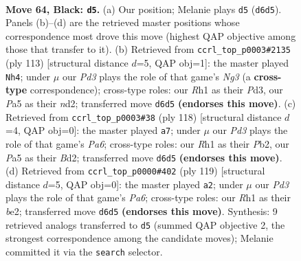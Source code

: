 \documentclass[11pt]{article}
\begin{document}
\clearpage

\begin{figure}[p]\centering
\begin{subfigure}{0.46\textwidth}\centering
\resizebox{\linewidth}{!}{%
\newchessgame
\chessboard[
  setfen={8/6k1/2pp4/p7/5K2/8/8/7r b - - 7 64},
  showmover=false,
  pgfstyle=straightmove, color=movearrow, markmove={d6-d5}
]}
\caption{}
\end{subfigure}\hfill
\begin{subfigure}{0.46\textwidth}\centering
\resizebox{\linewidth}{!}{%
\newchessgame
\chessboard[
  setfen={1k6/8/3K2n1/1p6/8/3p4/3N4/8 b - - 5 57},
  showmover=false,
  pgfstyle=straightmove, color=movearrow, markmove={g6-h4}
]}
\caption{}
\end{subfigure}
\\[4pt]
\begin{subfigure}{0.46\textwidth}\centering
\resizebox{\linewidth}{!}{%
\newchessgame
\chessboard[
  setfen={8/8/P1k5/7K/8/7b/1P1B1P2/8 w - - 1 60},
  showmover=false,
  pgfstyle=straightmove, color=movearrow, markmove={a6-a7}
]}
\caption{}
\end{subfigure}\hfill
\begin{subfigure}{0.46\textwidth}\centering
\resizebox{\linewidth}{!}{%
\newchessgame
\chessboard[
  setfen={8/8/5k2/8/5p1P/p1K5/4B3/8 b - - 1 60},
  showmover=false,
  pgfstyle=straightmove, color=movearrow, markmove={a3-a2}
]}
\caption{}
\end{subfigure}
\caption{\textbf{Move 64, Black: \texttt{d5}.} (a) Our position; Melanie plays \texttt{d5} (\texttt{d6d5}). Panels (b)--(d) are the retrieved master positions whose correspondence most drove this move (highest QAP objective among those that transfer to it). (b) Retrieved from \texttt{ccrl\_top\_p0003\#2135} (ply 113) [structural distance $d$=5, QAP obj=1]: the master played \texttt{Nh4}; under $\mu$ our \emph{Pd3} plays the role of that game's \emph{Ng3} (a \textbf{cross-type} correspondence); cross-type roles: our \emph{R}h1 as their \emph{P}d3, our \emph{P}a5 as their \emph{n}d2; transferred move \texttt{d6d5} \textbf{(endorses this move)}. (c) Retrieved from \texttt{ccrl\_top\_p0003\#38} (ply 118) [structural distance $d$=4, QAP obj=0]: the master played \texttt{a7}; under $\mu$ our \emph{Pd3} plays the role of that game's \emph{Pa6}; cross-type roles: our \emph{R}h1 as their \emph{P}b2, our \emph{P}a5 as their \emph{B}d2; transferred move \texttt{d6d5} \textbf{(endorses this move)}. (d) Retrieved from \texttt{ccrl\_top\_p0000\#402} (ply 119) [structural distance $d$=5, QAP obj=0]: the master played \texttt{a2}; under $\mu$ our \emph{Pd3} plays the role of that game's \emph{Pa6}; cross-type roles: our \emph{R}h1 as their \emph{b}e2; transferred move \texttt{d6d5} \textbf{(endorses this move)}. Synthesis: 9 retrieved analogs transferred to \texttt{d5} (summed QAP objective 2, the strongest correspondence among the candidate moves); Melanie committed it via the \texttt{search} selector.}
\label{fig:thought-m127}
\end{figure}
\end{document}
